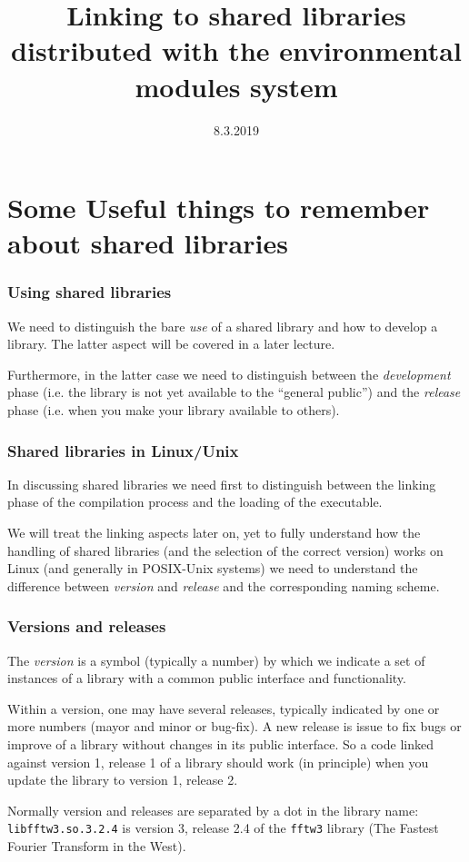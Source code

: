 \documentclass[9pt]{beamer}
\begin{document}
\title{Linking to shared libraries distributed with the environmental modules system}
\date{8.3.2019}

\begin{frame}
\maketitle
\end{frame}

\section{Some Useful things to remember about shared libraries}

\begin{frame}
\frametitle{Using shared libraries}
We need to distinguish the bare \emph{use} of a shared library and how
to develop a library. The latter aspect will be covered in a later lecture.
\medskip

Furthermore, in the latter case we need to distinguish between the
\emph{development} phase (i.e. the library is not yet available to the
``general public'') and the \emph{release} phase (i.e. when you make your
library available to others).
\end{frame}


\begin{frame}
  \frametitle{Shared libraries in Linux/Unix} In
  discussing shared libraries we need first to distinguish between the
  linking phase of the compilation process and the loading of the
  executable. 
\medskip

We will treat the linking aspects later on, yet to fully understand
how the handling of shared libraries (and the selection of the correct
version) works on Linux (and generally in POSIX-Unix systems) we need
to understand the difference between \emph{version} and \emph{release}
and the corresponding naming scheme.
\end{frame}

\begin{frame}
  \frametitle{Versions and releases} 
The \emph{version} is a symbol
  (typically a number) by which we indicate a set of instances of a
  library with \alert{a common public interface and functionality}.
  \smallskip

  Within a version, one may have several releases, typically indicated
  by one or more numbers (mayor and minor or bug-fix). A new release is 
  issue to fix bugs  or improve of a library \alert{without
    changes in its public interface}. So a code linked against version 1,
  release 1 of a library should work (in principle) when you update
  the library to version 1, release 2.
\smallskip

  Normally version and releases are separated by a dot in the library name:
  \texttt{libfftw3.so.3.2.4} is version 3, release 2.4 of the
  \texttt{fftw3} library (The Fastest Fourier Transform in the West).
\end{frame}
\end{document}
